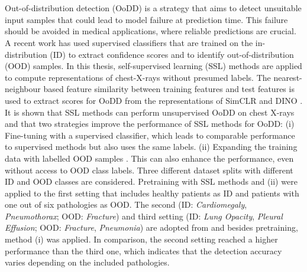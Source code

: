 \section*{}
Out-of-distribution detection (OoDD) is a strategy that aims to detect unsuitable input samples that could lead to model failure at prediction time.
This failure should be avoided in medical applications, where reliable predictions are crucial.
A recent work \citep{Berger2021} has used supervised classifiers that are trained on the in-distribution (ID) to extract confidence scores and to identify out-of-distribution (OOD) samples.
In this thesis, self-supervised learning (SSL) methods are applied to compute representations of chest-X-rays without presumed labels.
The nearest-neighbour based feature similarity between training features and test features \citep{Michels2023,Sun2022} is used to extract scores for OoDD from the representations of SimCLR \citep{Chen2020} and DINO \citep{Caron2021}.
It is shown that SSL methods can perform unsupervised OoDD on chest X-rays and that two strategies improve the performance of SSL methods for OoDD:
(i) Fine-tuning with a supervised classifier, which leads to comparable performance to supervised methods but also uses the same labels.
(ii) Expanding the training data with labelled OOD samples \citep{Fort2021,Hendrycks2018}.
This can also enhance the performance, even without access to OOD class labels.
Three different dataset splits with different ID and OOD classes are considered.
Pretraining with SSL methods and (ii) were applied to the first setting that includes healthy patients as ID and patients with one out of six pathologies as OOD.
The second (ID: \textit{Cardiomegaly}, \textit{Pneumothorax}; OOD: \textit{Fracture}) and third setting (ID: \textit{Lung Opacity}, \textit{Pleural Effusion}; OOD: \textit{Fracture}, \textit{Pneumonia}) are adopted from \citep{Berger2021} and besides pretraining, method (i) was applied.
In comparison, the second setting reached a higher performance than the third one, which indicates that the detection accuracy varies depending on the included pathologies. 